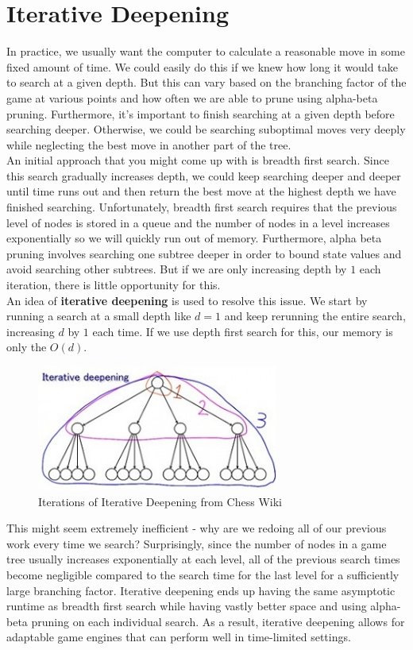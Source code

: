 \documentclass[12pt, letterpaper]{article}
\begin{document}
\section*{Iterative Deepening}
In practice, we usually want the computer to calculate a reasonable move in some fixed amount of time. We could easily do this if we knew how long it would take to search at a given depth. But this can vary based on the branching factor of the game at various points and how often we are able to prune using alpha-beta pruning. Furthermore, it's important to finish searching at a given depth before searching deeper. Otherwise, we could be searching suboptimal moves very deeply while neglecting the best move in another part of the tree. \\[0.2cm]
An initial approach that you might come up with is breadth first search. Since this search gradually increases depth, we could keep searching deeper and deeper until time runs out and then return the best move at the highest depth we have finished searching. Unfortunately, breadth first search requires that the previous level of nodes is stored in a queue and the number of nodes in a level increases exponentially so we will quickly run out of memory. Furthermore, alpha beta pruning involves searching one subtree deeper in order to bound state values and avoid searching other subtrees. But if we are only increasing depth by $1$ each iteration, there is little opportunity for this. \\[0.2cm]
\newpage
An idea of \textbf{iterative deepening} is used to resolve this issue. We start by running a search at a small depth like $d = 1$ and keep rerunning the entire search, increasing $d$ by $1$ each time. If we use depth first search for this, our memory is only the $O(d)$. \\[0.2cm]
\begin{figure}[H]
    \centering
    \includegraphics[]{iterative_deepening.jpg}
    \caption*{Iterations of Iterative Deepening from Chess Wiki}
\end{figure}
This might seem extremely inefficient - why are we redoing all of our previous work every time we search? Surprisingly, since the number of nodes in a game tree usually increases exponentially at each level, all of the previous search times become negligible compared to the search time for the last level for a sufficiently large branching factor. Iterative deepening ends up having the same asymptotic runtime as breadth first search while having vastly better space and using alpha-beta pruning on each individual search. As a result, iterative deepening allows for adaptable game engines that can perform well in time-limited settings.
\end{document}
